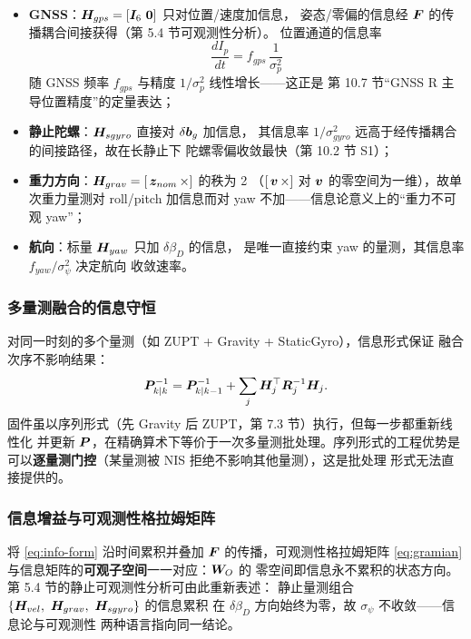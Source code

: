 \begin{itemize}
  \item \textbf{GNSS}：$\boldsymbol{H}_{gps} = [\boldsymbol{I}_6\ \boldsymbol{0}]$ 只对位置/速度加信息，
    姿态/零偏的信息经 $\boldsymbol{F}$ 的传播耦合间接获得（第 5.4 节可观测性分析）。
    位置通道的信息率
    \begin{equation}
      \frac{dI_p}{dt} = f_{gps}\,\frac{1}{\sigma_p^2}
      \label{eq:info-rate-pos}
    \end{equation}
    随 GNSS 频率 $f_{gps}$ 与精度 $1/\sigma_p^2$ 线性增长——这正是
    第 10.7 节``GNSS R 主导位置精度''的定量表达；
  \item \textbf{静止陀螺}：$\boldsymbol{H}_{sgyro}$ 直接对 $\delta\boldsymbol{b}_g$ 加信息，
    其信息率 $1/\sigma_{gyro}^2$ 远高于经传播耦合的间接路径，故在长静止下
    陀螺零偏收敛最快（第 10.2 节 S1）；
  \item \textbf{重力方向}：$\boldsymbol{H}_{grav} = [\,\boldsymbol{z}_{nom}\,\times]$ 的秩为 2
    （$[\,\boldsymbol{v}\,\times]$ 对 $\boldsymbol{v}$ 的零空间为一维），故单次重力量测对
    roll/pitch 加信息而对 yaw 不加——信息论意义上的``重力不可观 yaw''；
  \item \textbf{航向}：标量 $\boldsymbol{H}_{yaw}$ 只加 $\delta\beta_D$ 的信息，
    是唯一直接约束 yaw 的量测，其信息率 $f_{yaw}/\sigma_\psi^2$ 决定航向
    收敛速率。
\end{itemize}

\subsubsection{多量测融合的信息守恒}

对同一时刻的多个量测（如 ZUPT + Gravity + StaticGyro），信息形式保证
融合次序不影响结果：
\begin{equation}
  \boldsymbol{P}_{k|k}^{-1} = \boldsymbol{P}_{k|k-1}^{-1} + \sum_j \boldsymbol{H}_j^{\top}\boldsymbol{R}_j^{-1}\boldsymbol{H}_j.
  \label{eq:info-sum}
\end{equation}
固件虽以序列形式（先 Gravity 后 ZUPT，第 7.3 节）执行，但每一步都重新线性化
并更新 $\boldsymbol{P}$，在精确算术下等价于一次多量测批处理。序列形式的工程优势是
可以\textbf{逐量测门控}（某量测被 NIS 拒绝不影响其他量测），这是批处理
形式无法直接提供的。

\subsubsection{信息增益与可观测性格拉姆矩阵}

将 \cref{eq:info-form} 沿时间累积并叠加 $\boldsymbol{F}$ 的传播，可观测性格拉姆矩阵
\cref{eq:gramian} 与信息矩阵的\textbf{可观子空间}一一对应：$\boldsymbol{W}_O$ 的
零空间即信息永不累积的状态方向。第 5.4 节的静止可观测性分析可由此重新表述：
静止量测组合 $\{\m{H}_{vel},\ \m{H}_{grav},\ \m{H}_{sgyro}\}$ 的信息累积
在 $\delta\beta_D$ 方向始终为零，故 $\sigma_\psi$ 不收敛——信息论与可观测性
两种语言指向同一结论。
